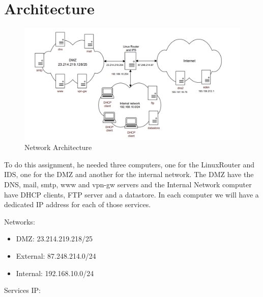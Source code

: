 \documentclass{article}
\begin{document}
\section{Architecture}

\begin{figure}[H]
    \centering
    \includegraphics[scale=0.5]{pics/architecture_sti2.png}
    \caption{Network Architecture}
    \label{fig:network-arc}
\end{figure}

\texttt{}\par To do this assignment, he needed three computers, one for the LinuxRouter and IDS, one for the DMZ and another for the internal network. The DMZ have the DNS, mail, smtp, www and vpn-gw servers and the Internal Network computer have DHCP clients, FTP server and a datastore. In each computer we will have a dedicated IP address for each of those services.\par
\textbf{}
\par 
Networks:
\begin{itemize}
    \item DMZ: 23.214.219.218/25
    \item External: 87.248.214.0/24
    \item Internal: 192.168.10.0/24\par
\end{itemize}
\par
Services IP:
\end{document}
